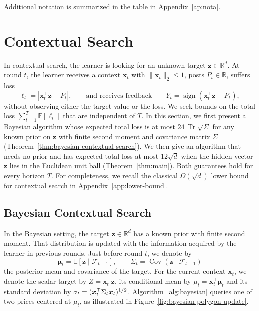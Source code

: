 \documentclass[11pt]{article}
\newcommand{\E}[1]{\mathbb E\left[#1\right]}
\newcommand{\R}{\mathbb R}
\DeclareMathOperator{\Cov}{Cov}
\DeclareMathOperator{\Tr}{Tr}
\newcommand{\norm}[1]{\lVert #1\rVert_2}
\newcommand{\bmu}{\boldsymbol\mu}
\newcommand{\bx}{\boldsymbol x}
\newcommand{\bz}{\boldsymbol z}
\begin{document}
Additional notation is summarized in the table in Appendix~\ref{ap:nota}.

\section{Contextual Search}\label{sec:search}

In contextual search, the learner is looking for an unknown target $\bz\in\R^d$. At round $t$, the learner receives a context $\bx_t$ with $\norm{\bx_t}\le1$, posts $P_t\in\R$, suffers loss 
\[
 \ell_t=|\bx_t^\top\bz-P_t|, \qquad\text{and receives feedback}\qquad Y_t=\operatorname{sign}(\bx_t^\top\bz-P_t),
\]
without observing either the target value or the loss.  We seek bounds on the total loss $\sum_{t=1}^T\E{\ell_t}$ that are independent of $T$.
% 
In this section, we first present a Bayesian algorithm whose expected total loss is at most $24\,\Tr\sqrt{\Sigma}$ for any known prior on $\bz$ with finite second moment and covariance matrix $\Sigma$ (Theorem~\ref{thm:bayesian-contextual-search}). We then give an algorithm that needs no prior and has expected total loss at most $12\sqrt d$ when the hidden vector $\bz$ lies in the Euclidean unit ball (Theorem~\ref{thm:main}). Both guarantees hold for every horizon $T$. For completeness, we recall the classical $\Omega(\sqrt d)$ lower bound for contextual search in Appendix~\ref{app:lower-bound}.

\subsection{Bayesian Contextual Search}\label{sec:bayes}\label{sec:gap}


In the Bayesian setting, the target $\bz\in\R^d$ has a known prior with finite second moment. That distribution is updated with the information {acquired} by the learner in previous rounds. Just before round $t$, we denote by
\[
 \bmu_t=\E{\bz\mid\mathcal F_{t-1}},
 \qquad \Sigma_t=\Cov(\bz\mid\mathcal F_{t-1})
\]
the posterior mean and covariance of the target. For the current context $\bx_t$, we denote the scalar target by $Z=\bx_t^\top\bz$, its conditional mean by $\mu_t=\bx_t^\top\bmu_t$ and its standard deviation by $\sigma_t=\agsqrt{\bx_t^\top\Sigma_t\bx_t}$. Algorithm~\ref{alg:bayesian} queries one of two prices centered at $\mu_t$, as illustrated in Figure~\ref{fig:bayesian-polygon-update}.
\end{document}
